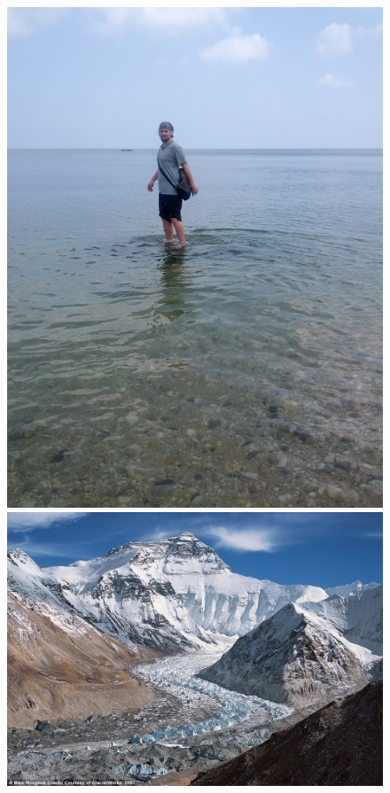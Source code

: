 \documentclass[11pt]{article}
\begin{document}
\begin{figure} [ht]
\begin{center}
\includegraphics[scale=0.2]{results_poisson/set2/im1.jpg}  
\includegraphics[scale=0.2]{results_poisson/set2/im2.jpg}

\end{center}
\end{figure}
\end{document}
